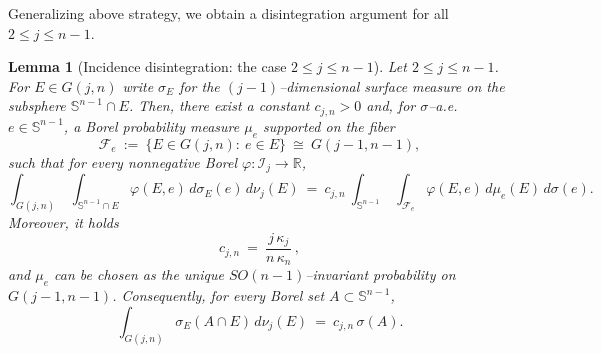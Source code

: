 \documentclass[11pt]{article}
\newtheorem{lemma}[theorem]{Lemma}
\theoremstyle{definition}
\numberwithin{equation}{section}
\newcommand{\R}{\mathbb{R}}
\newcommand{\Sph}{\mathbb{S}}        %
\begin{document}
Generalizing above strategy, we obtain a disintegration argument for all $2 \leq j \leq n - 1$.

\begin{lemma}[Incidence disintegration: the case $2 \leq j \leq  n  - 1$]\label{lem:incidence}
Let $2 \leq j \leq  n - 1$.
For $E\in G(j,n)$ write $\sigma_E$ for the $(j-1)$–dimensional surface measure on the subsphere $\Sph^{n-1}\cap E$. 
Then, there exist a constant $c_{j,n}>0$ and, for $\sigma$–a.e.\ $e\in \Sph^{n-1}$, a Borel probability measure $\mu_e$ supported on the fiber
\[
\mathcal F_e\ :=\ \{E\in G(j,n):\ e\in E\}\ \cong\ G(j-1,n-1),
\]
such that for every nonnegative Borel $\varphi:\mathcal I_j\to\R$,
\begin{equation}\label{eq:incidence-disintegration}
  \int_{G(j,n)}\ \int_{\Sph^{n-1}\cap E}\!\varphi(E,e)\,d\sigma_E(e)\,d\nu_j(E)
  \ =\
  c_{j,n}\ \int_{\Sph^{n-1}}\ \int_{\mathcal F_e}\! \varphi(E,e)\,d\mu_e(E)\,d\sigma(e).
\end{equation}
Moreover, it holds
\begin{equation}\label{eq:cjn}
  c_{j,n}\ =\ \frac{j\,\kappa_j}{n\,\kappa_n}\,,
\end{equation}
and 
$\mu_e$ can be chosen as the unique $SO(n-1)$–invariant probability on $G(j-1,n-1)$.
Consequently, for every Borel set $A\subset \Sph^{n-1}$,
\begin{equation}\label{eq:incidence-indicator}
 \int_{G(j,n)} \sigma_E(A\cap E)\,d\nu_j(E)\ =\ c_{j,n}\,\sigma(A).
\end{equation}
\end{lemma}
\end{document}
